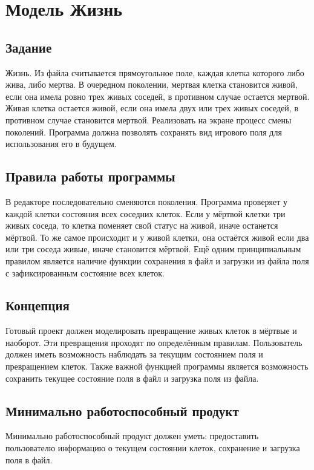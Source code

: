 \documentclass[a4paper]{article}
\begin{document}
\vfill %
\tableofcontents
\newpage

\section{Модель Жизнь}
\subsection{Задание}
Жизнь. Из файла считывается прямоугольное поле, каждая клетка которого либо жива, либо мертва. В очередном поколении, мертвая клетка становится живой, если она имела ровно трех живых соседей, в противном случае остается мертвой. Живая клетка остается живой, если она имела двух или трех живых соседей, в противном случае становится мертвой. Реализовать на экране процесс смены поколений. Программа должна позволять сохранять вид игрового поля для использования его в будущем.

\subsection{Правила работы программы}
В редакторе последовательно сменяются поколения. Программа проверяет у каждой клетки состояния всех соседних клеток. Если у мёртвой клетки три живых соседа, то клетка поменяет свой статус на живой, иначе останется мёртвой. То же самое происходит и у живой клетки, она остаётся живой если два или три соседа живые, иначе становится мёртвой. Ещё одним принципиальным правилом является наличие функции сохранения в файл и загрузки из файла поля с зафиксированным состояние всех клеток.

\subsection{Концепция}
Готовый проект должен моделировать превращение живых клеток в мёртвые и наоборот. Эти превращения проходят по определённым правилам. Пользователь должен иметь возможность наблюдать за текущим состоянием поля и превращением клеток. Также важной функцией программы является возможность сохранить текущее состояние поля в файл и загрузка поля из файла. 

\subsection{Минимально работоспособный продукт}
Минимально работоспособный продукт должен уметь: предоставить пользователю информацию о текущем состоянии клеток, сохранение и загрузка поля в файл.
\end{document}
